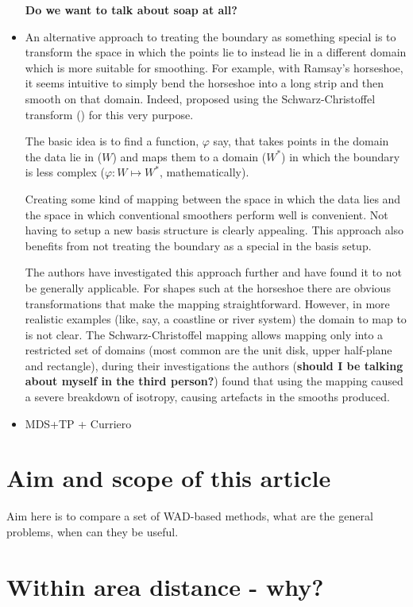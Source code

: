 \documentclass[10pt]{article}
\begin{document}
\begin{itemize}
\textbf{Do we want to talk about soap at all?}

\item An alternative approach to treating the boundary as something special is to transform the space in which the points lie to instead lie in a different domain which is more suitable for smoothing. For example, with Ramsay's horseshoe, it seems intuitive to simply bend the horseshoe into a long strip and then smooth on that domain. Indeed, \cite{eilerstalk} proposed using the Schwarz-Christoffel transform (\cite{driscoll}) for this very purpose. 

The basic idea is to find a function, $\varphi$ say, that takes points in the domain the data lie in ($W$) and maps them to a domain ($W^*$) in which the boundary is less complex ($\varphi : W \mapsto W^*$, mathematically).

Creating some kind of mapping between the space in which the data lies and the space in which conventional smoothers perform well is convenient. Not having to setup a new basis structure is clearly appealing. This approach also benefits from not treating the boundary as a special in the basis setup.

The authors have investigated this approach further and have found it to not be generally applicable. For shapes such at the horseshoe there are obvious transformations that make the mapping straightforward. However, in more realistic examples (like, say, a coastline or river system) the domain to map to is not clear. The Schwarz-Christoffel mapping allows mapping only into a restricted set of domains (most common are the unit disk, upper half-plane and rectangle), during their investigations the authors (\textbf{should I be talking about myself in the third person?}) found that using the mapping caused a severe breakdown of isotropy, causing artefacts in the smooths produced. 

\item MDS+TP + Curriero
\end{itemize}

\section{Aim and scope of this article}

Aim here is to compare a set of WAD-based methods, what are the general problems, when can they be useful.

\section{Within area distance - why?}
\end{document}
